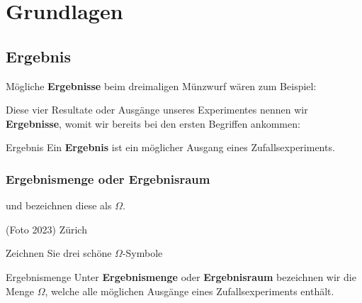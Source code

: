 \section{Grundlagen}




\subsection{Ergebnis}

Mögliche \textbf{Ergebnisse} beim dreimaligen Münzwurf wären zum
Beispiel:


Diese vier Resultate oder Ausgänge unseres Experimentes nennen wir \textbf{Ergebnisse}, womit wir bereits
bei den ersten Begriffen ankommen:

\begin{definition}{Ergebnis}{}
Ein \textbf{Ergebnis} ist ein möglicher Ausgang eines
Zufallsexperiments.
\end{definition}


\subsubsection{Ergebnismenge oder Ergebnisraum}

und bezeichnen diese als $\Omega$.

\begin{center}{\small{(Foto 2023) Zürich}}\end{center}
Zeichnen Sie drei schöne {\huge $\Omega$}-Symbole

\begin{definition}{Ergebnismenge}{}
  Unter \textbf{Ergebnismenge} oder \textbf{Ergebnisraum} bezeichnen
  wir die Menge $\Omega$, welche alle möglichen Ausgänge eines
  Zufallsexperiments enthält.
\end{definition}

\newpage
